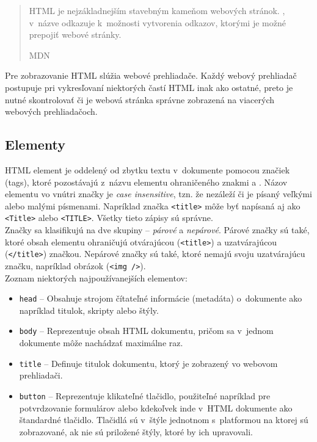 \blockquote[MDN \cite{MDN}]{HTML je nejzákladnejším stavebným kameňom webových stránok. , v~názve odkazuje k~možnosti vytvorenia odkazov, ktorými je možné prepojiť webové stránky.}

\noindent Pre zobrazovanie HTML slúžia webové prehliadače. Každý webový prehliadač postupuje pri vykresľovaní niektorých častí HTML inak ako ostatné, preto je nutné skontrolovať či je webová stránka správne zobrazená na viacerých webových prehliadačoch.

\subsection{Elementy}
\label{theory:HTML:elements}
HTML element je oddelený od zbytku textu v~dokumente pomocou značiek (tags), ktoré pozostávajú z~názvu elementu ohraničeného znakmi \uv{\texttt{<}} a \uv{\texttt{>}}. Názov elementu vo vnútri značky je \emph{case insensitive}, tzn. že nezáleží či je písaný veľkými alebo malými písmenami. Napríklad značka \texttt{<title>} môže byť napísaná aj ako \texttt{<Title>} alebo \texttt{<TITLE>}. Všetky tieto zápisy sú správne. \cite{MDN} \\

\noindent Značky sa klasifikujú na dve skupiny -- \emph{párové} a \emph{nepárové}. Párové značky sú také, ktoré obsah elementu ohraničujú otvárajúcou (\texttt{<title>}) a uzatvárajúcou (\texttt{</title>}) značkou. Nepárové značky sú také, ktoré nemajú svoju uzatvárajúcu značku, napríklad obrázok (\texttt{<img />}). \\

\noindent Zoznam niektorých najpoužívanejších elementov:
\begin{itemize}
	\item \texttt{head} -- Obsahuje strojom čítateľné informácie (metadáta) o~dokumente ako napríklad titulok, skripty alebo štýly. \cite{MDN}
	\item \texttt{body} -- Reprezentuje obsah HTML dokumentu, pričom sa v~jednom dokumente môže nachádzať maximálne raz. \cite{MDN}
	\item \texttt{title} -- Definuje titulok dokumentu, ktorý je zobrazený vo webovom prehliadači. \cite{MDN}
	\item \texttt{button} -- Reprezentuje klikateľné tlačidlo, použiteľné napríklad pre potvrdzovanie formulárov alebo kdekoľvek inde v~HTML dokumente ako štandardné tlačidlo. Tlačidlá sú v~štýle jednotnom s~platformou na ktorej sú zobrazované, ak nie sú priložené štýly, ktoré by ich upravovali. \cite{MDN}
\end{itemize}

